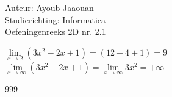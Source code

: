 \documentclass[a4paper]{article}
\begin{document}
\noindent \large Auteur: Ayoub Jaaouan \\
\noindent \large Studierichting: Informatica\\
\noindent \large Oefeningenreeks 2D nr. 2.1\\

\medskip

\normalsize

$\lim\limits_{x \rightarrow 2} (3x^2-2x+1) = (12-4+1) = 9$\\

$\lim\limits_{x \rightarrow \infty} (3x^2-2x+1) = \lim\limits_{x \rightarrow \infty} 3x^2 = +\infty$\\


\begin{thebibliography}{999}
\end{thebibliography}
\end{document}
